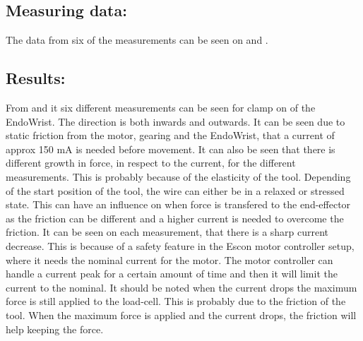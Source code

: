 \subsection*{Measuring data:}
The data from six of the measurements can be seen on  and .

%

%




\subsection*{Results:}
From  and  it six different measurements can be seen for clamp on of the EndoWrist. The direction is both inwards and outwards. It can be seen due to static friction from the motor, gearing and the EndoWrist, that a current of approx 150 mA is needed before movement. It can also be seen that there is different growth in force, in respect to the current, for the different measurements. This is probably because of the elasticity of the tool. Depending of the start position of the tool, the wire can either be in a relaxed or stressed state. This can have an influence on when force is transfered to the end-effector as the friction can be different and a higher current is needed to overcome the friction. It can be seen on each measurement, that there is a sharp current decrease. This is because of a safety feature in the Escon motor controller setup, where it needs the nominal current for the motor. The motor controller can handle a current peak for a certain amount of time and then it will limit the current to the nominal. It should be noted when the current drops the maximum force is still applied to the load-cell. This is probably due to the friction of the tool. When the maximum force is applied and the current drops, the friction will help keeping the force.



